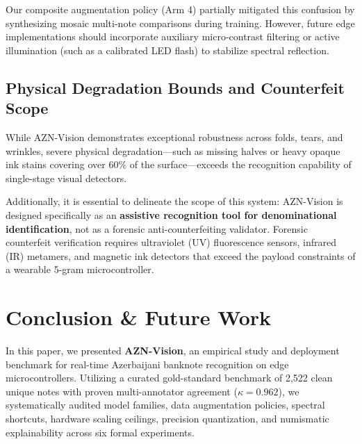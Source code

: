 \documentclass[conference]{IEEEtran}
\begin{document}
Our composite augmentation policy (Arm 4) partially mitigated this confusion by synthesizing mosaic multi-note comparisons during training. However, future edge implementations should incorporate auxiliary micro-contrast filtering or active illumination (such as a calibrated LED flash) to stabilize spectral reflection.

\subsection{Physical Degradation Bounds and Counterfeit Scope}
While AZN-Vision demonstrates exceptional robustness across folds, tears, and wrinkles, severe physical degradation---such as missing halves or heavy opaque ink stains covering over $60\%$ of the surface---exceeds the recognition capability of single-stage visual detectors. 

Additionally, it is essential to delineate the scope of this system: AZN-Vision is designed specifically as an \textbf{assistive recognition tool for denominational identification}, not as a forensic anti-counterfeiting validator. Forensic counterfeit verification requires ultraviolet (UV) fluorescence sensors, infrared (IR) metamers, and magnetic ink detectors that exceed the payload constraints of a wearable 5-gram microcontroller.

\balance
\section{Conclusion \& Future Work}
\label{sec:conclusion}

In this paper, we presented \textbf{AZN-Vision}, an empirical study and deployment benchmark for real-time Azerbaijani banknote recognition on edge microcontrollers. Utilizing a curated gold-standard benchmark of 2,522 clean unique notes with proven multi-annotator agreement ($\kappa = 0.962$), we systematically audited model families, data augmentation policies, spectral shortcuts, hardware scaling ceilings, precision quantization, and numismatic explainability across six formal experiments. 
\end{document}
